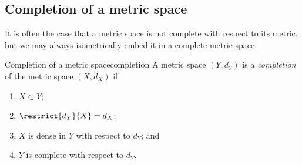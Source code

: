 \subsection{Completion of a metric space}
It is often the case that a metric space is not complete with respect to its metric, but we may always isometrically embed it in a complete metric space.
\begin{definition}{Completion of a metric space}{completion}
    A metric space \((Y,d_Y)\) is a \emph{completion} of the metric space \((X,d_X)\) if
    \begin{enumerate}[label=(\alph*)]
        \item \(X \subset Y\);
        \item \(\restrict{d_Y}{X} = d_X\);
        \item \(X\) is dense in \(Y\) with respect to \(d_Y\); and
        \item \(Y\) is complete with respect to \(d_Y\).
    \end{enumerate}
\end{definition}

